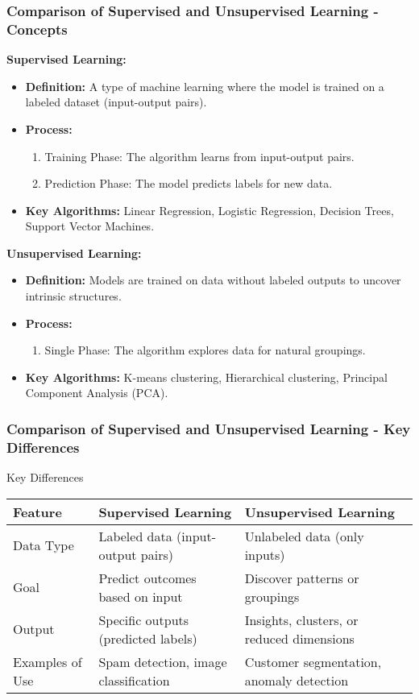 \documentclass[aspectratio=169]{beamer}
\begin{document}
\begin{frame}[fragile]
    \frametitle{Comparison of Supervised and Unsupervised Learning - Concepts}
    
    \textbf{Supervised Learning:}
    \begin{itemize}
        \item \textbf{Definition:} A type of machine learning where the model is trained on a labeled dataset (input-output pairs).
        \item \textbf{Process:}
        \begin{enumerate}
            \item Training Phase: The algorithm learns from input-output pairs.
            \item Prediction Phase: The model predicts labels for new data.
        \end{enumerate}
        \item \textbf{Key Algorithms:} Linear Regression, Logistic Regression, Decision Trees, Support Vector Machines.
    \end{itemize}
    
    \textbf{Unsupervised Learning:}
    \begin{itemize}
        \item \textbf{Definition:} Models are trained on data without labeled outputs to uncover intrinsic structures.
        \item \textbf{Process:}
        \begin{enumerate}
            \item Single Phase: The algorithm explores data for natural groupings.
        \end{enumerate}
        \item \textbf{Key Algorithms:} K-means clustering, Hierarchical clustering, Principal Component Analysis (PCA).
    \end{itemize}
\end{frame}

\begin{frame}[fragile]
    \frametitle{Comparison of Supervised and Unsupervised Learning - Key Differences}
    
    \begin{block}{Key Differences}
    \begin{tabular}{|l|l|l|}
        \hline
        \textbf{Feature} & \textbf{Supervised Learning} & \textbf{Unsupervised Learning} \\
        \hline
        Data Type & Labeled data (input-output pairs) & Unlabeled data (only inputs) \\
        \hline
        Goal & Predict outcomes based on input & Discover patterns or groupings \\
        \hline
        Output & Specific outputs (predicted labels) & Insights, clusters, or reduced dimensions \\
        \hline
        Examples of Use & Spam detection, image classification & Customer segmentation, anomaly detection \\
        \hline
    \end{tabular}
    \end{block}
\end{frame}
\end{document}
